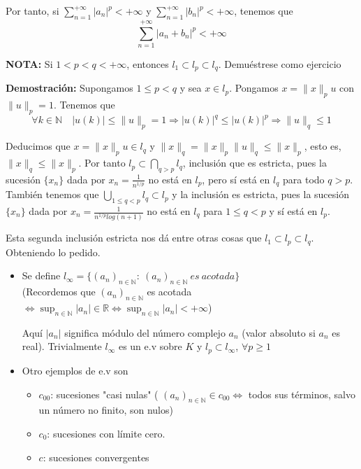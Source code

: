\documentclass{article}
\begin{document}
\begin{enumerate}
Por tanto, si $\sum_{n=1}^{+\infty} |a_n|^p<+\infty$ y  $\sum_{n=1}^{+\infty}|b_n|^p<+\infty$, tenemos que
\begin{equation*}
\sum_{n=1}^{+\infty} |a_n+b_n|^p<+\infty
\end{equation*}

\textbf{NOTA:} Si $1<p<q<+\infty$, entonces $l_1\subset l_p\subset l_q$. Demuéstrese como ejercicio

\textbf{Demostración:} Supongamos $1\leq p<q$ y sea $x\in l_p$. Pongamos $x=\|x\|_pu$ con $\|u\|_p=1$. Tenemos que
\begin{equation*}
\forall k\in \mathbb{N}\quad |u(k)|\leq \|u\|_p=1\Rightarrow |u(k)|^q\leq |u(k)|^p\Rightarrow \|u\|_q\leq 1
\end{equation*}

Deducimos que $x=\|x\|_pu\in l_q$ y $\|x\|_q=\|x\|_p\|u\|_q\leq \|x\|_p$, esto es, $\|x\|_q\leq\|x\|_p$. Por tanto $l_p\subset \bigcap_{q>p}l_q$, inclusión que es estricta, pues la sucesión $\{x_n\}$ dada por $x_n=\frac{1}{n^{1/p}}$ no está en $l_p$, pero sí está en $l_q$ para todo $q>p$. También tenemos que $\bigcup_{1\leq q<p} l_q\subset l_p$ y la inclusión es estricta, pues la sucesión $\{x_n\}$ dada por $x_n=\frac{1}{n^{1/p}log(n+1)}$ no está en $l_q$ para $1\leq q<p$ y sí está en $l_p$.

Esta segunda inclusión estricta nos dá entre otras cosas que $l_1\subset l_p\subset l_q$. Obteniendo lo pedido.

	\begin{itemize}
	\item Se define $l_\infty=\{(a_n)_{n\in\mathbb{N}}:\:(a_n)_{n\in\mathbb{N}}\:es\:acotada\}$ \\
	
	(Recordemos que $(a_n)_{n\in\mathbb{N}}$ es acotada $\Leftrightarrow \sup_{n\in\mathbb{N}}|a_n|\in \mathbb{R}\Leftrightarrow \sup_{n\in\mathbb{N}}|a_n|<+\infty$)
	
	Aquí $|a_n|$ significa módulo del número complejo $a_n$ (valor absoluto si $a_n$ es real). Trivialmente $l_\infty$ es un e.v sobre $K$ y $l_p\subset l_\infty$, $\forall p\geq 1$
	
	\item Otro ejemplos de e.v son 
	\begin{itemize}
	\item $c_{00}$: sucesiones "casi nulas" ( $(a_n)_{n\in\mathbb{N}}\in c_{00}\Leftrightarrow $ todos sus términos, salvo un número no finito, son nulos)
	\item $c_0$: sucesiones con límite cero.
	\item $c$: sucesiones convergentes
	\end{itemize}
	

\end{itemize}
\end{enumerate}
\end{document}
